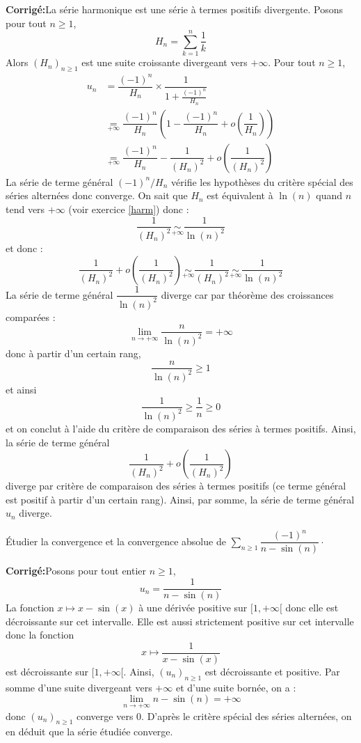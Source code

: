 \documentclass[a4paper,twoside,french,10pt]{VcCours}
\newcommand{\corr}{\textbf{Corrigé:}}
\newcommand{\Sum}[2]{\ensuremath{\textstyle{\sum\limits_{#1}^{#2}}}}
\begin{document}
\corr La série harmonique est une série à termes positifs divergente. Posons pour  tout $n \geq 1$,
$$ H_n = \sum_{k=1}^n \dfrac{1}{k}$$
Alors $(H_n)_{n \geq 1}$ est une suite croissante divergeant vers $+ \infty$. Pour tout $n \geq 1$,
\begin{align*}
u_n & = \dfrac{(-1)^n}{H_n} \times \dfrac{1}{1+ \frac{(-1)^n}{H_n}} \\
& \underset{+\infty}{=}  \dfrac{(-1)^n}{H_n} \left( 1 - \dfrac{(-1)^n}{H_n} + o \left( \dfrac{1}{H_n} \right) \right) \\
& \underset{+\infty}{=}  \dfrac{(-1)^n}{H_n}  -\dfrac{1}{(H_n)^2} + o \left( \dfrac{1}{(H_n)^2} \right) 
\end{align*}
La série de terme général $(-1)^n/H_n$ vérifie les hypothèses du critère spécial des séries alternées donc converge. On sait que $H_n$ est équivalent à $\ln(n)$ quand $n$ tend vers $+ \infty$ (voir exercice \ref{harm}) donc :
$$ \dfrac{1}{(H_n)^2} \underset{+ \infty}{\sim} \dfrac{1}{\ln(n)^2}$$
et donc :
$$ \dfrac{1}{(H_n)^2} + o \left( \dfrac{1}{(H_n)^2} \right)  \underset{+ \infty}{\sim}  \dfrac{1}{(H_n)^2} \underset{+ \infty}{\sim} \dfrac{1}{\ln(n)^2}$$
La série de terme général $\dfrac{1}{\ln(n)^2}$ diverge car par théorème des croissances comparées :
$$ \lim_{n \rightarrow + \infty} \dfrac{n}{\ln(n)^2} = + \infty$$
donc à partir d'un certain rang,
$$ \dfrac{n}{\ln(n)^2} \geq 1$$
et ainsi 
$$ \dfrac{1}{\ln(n)^2} \geq \dfrac{1}{n} \geq 0$$
et on conclut à l'aide du critère de comparaison des séries à termes positifs. Ainsi, la série de terme général 
$$\dfrac{1}{(H_n)^2} + o \left( \dfrac{1}{(H_n)^2} \right)$$
diverge par critère de comparaison des séries à termes positifs (ce terme général est positif à partir d'un certain rang). Ainsi, par somme, la série de terme général $u_n$ diverge.

\medskip

\begin{Exercice}{} Étudier la convergence et la convergence absolue de $\Sum{n \geq 1}{} \dfrac{(-1)^n}{n-\sin(n)}\cdot$
\end{Exercice}

\corr Posons pour tout entier $n \geq 1$,
$$ u_n = \dfrac{1}{n-\sin(n)}$$
La fonction $x \mapsto x- \sin(x)$ à une dérivée positive sur $[1, + \infty[$ donc elle est décroissante sur cet intervalle. Elle est aussi strictement positive sur cet intervalle donc la fonction 
$$ x \mapsto \dfrac{1}{x-\sin(x)}$$
est décroissante sur $[1, + \infty[$. Ainsi, $(u_n)_{n \geq 1}$ est décroissante et positive. Par somme d'une suite divergeant vers $+ \infty$ et d'une suite bornée, on a :
$$ \lim_{n \rightarrow + \infty} n - \sin(n) = + \infty$$
donc $(u_n)_{n \geq 1}$ converge vers $0$. D'après le critère spécial des séries alternées, on en déduit que la série étudiée converge.
\end{document}
